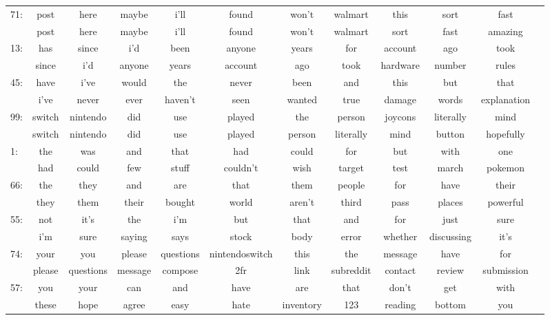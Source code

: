 \documentclass[11pt]{article} %
\begin{document}
\begin{landscape}
\begin{tabular}{|l|c c c c c c c c c c c}
71: &  post&here&maybe&i'll&found&won't&walmart&this&sort&fast\\
        & post&here&maybe&i'll&found&won't&walmart&sort&fast&amazing\\
13: &  has&since&i'd&been&anyone&years&for&account&ago&took\\
        & since&i'd&anyone&years&account&ago&took&hardware&number&rules\\
45: &  have&i've&would&the&never&been&and&this&but&that\\
        & i've&never&ever&haven't&seen&wanted&true&damage&words&explanation\\
99: &  switch&nintendo&did&use&played&the&person&joycons&literally&mind\\
        & switch&nintendo&did&use&played&person&literally&mind&button&hopefully\\
1: &  the&was&and&that&had&could&for&but&with&one\\
        & had&could&few&stuff&couldn't&wish&target&test&march&pokemon\\
66: &  the&they&and&are&that&them&people&for&have&their\\
        & they&them&their&bought&world&aren't&third&pass&places&powerful\\
55: &  not&it's&the&i'm&but&that&and&for&just&sure\\
        & i'm&sure&saying&says&stock&body&error&whether&discussing&it's\\
74: &  your&you&please&questions&nintendoswitch&this&the&message&have&for\\
        & please&questions&message&compose&2fr&link&subreddit&contact&review&submission\\
57: &  you&your&can&and&have&are&that&don't&get&with\\
        & these&hope&agree&easy&hate&inventory&123&reading&bottom&you\\

\end{tabular}
\end{landscape}
\restoregeometry
\end{document}
